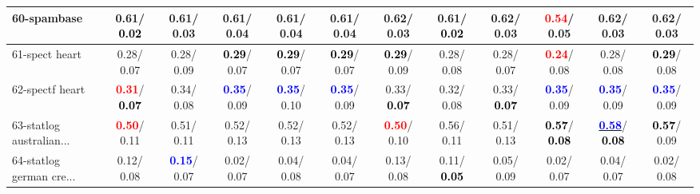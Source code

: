 \begin{table}[h]
\begin{center}
{\begin{tabular}{lc|c|c|c|c|c|c|c|c|c|c}
60-spambase &   0.61/\textcolor{black}{\textbf{  0.02}} &   0.61/  0.03 &   0.61/  0.04 &   0.61/  0.04 &   0.61/  0.04 &   0.62/  0.03 &   0.61/\textcolor{black}{\textbf{  0.02}} &   0.62/  0.03 & \textcolor{red}{\textbf{  0.54}}/  0.05 &   0.62/  0.03 &   0.62/  0.03 \\ \hline
61-spect heart &   0.28/  0.07 &   0.28/  0.09 & \textcolor{black}{\textbf{  0.29}}/  0.07 & \textcolor{black}{\textbf{  0.29}}/  0.07 & \textcolor{black}{\textbf{  0.29}}/  0.07 & \textcolor{black}{\textbf{  0.29}}/  0.09 &   0.28/  0.08 &   0.28/  0.07 & \textcolor{red}{\textbf{  0.24}}/  0.08 &   0.28/  0.08 & \textcolor{black}{\textbf{  0.29}}/  0.08 \\
62-spectf heart & \textcolor{red}{\textbf{  0.31}}/\textcolor{black}{\textbf{  0.07}} &   0.34/  0.08 & \textcolor{blue}{\textbf{  0.35}}/  0.09 & \textcolor{blue}{\textbf{  0.35}}/  0.10 & \textcolor{blue}{\textbf{  0.35}}/  0.09 &   0.33/\textcolor{black}{\textbf{  0.07}} &   0.32/  0.08 &   0.33/\textcolor{black}{\textbf{  0.07}} & \textcolor{blue}{\textbf{  0.35}}/  0.09 & \textcolor{blue}{\textbf{  0.35}}/  0.09 & \textcolor{blue}{\textbf{  0.35}}/  0.09 \\
63-statlog australian... & \textcolor{red}{\textbf{  0.50}}/  0.11 &   0.51/  0.11 &   0.52/  0.13 &   0.52/  0.13 &   0.52/  0.13 & \textcolor{red}{\textbf{  0.50}}/  0.10 &   0.56/  0.11 &   0.51/  0.13 & \textcolor{black}{\textbf{  0.57}}/\textcolor{black}{\textbf{  0.08}} & \underline{\textcolor{blue}{\textbf{  0.58}}}/\textcolor{black}{\textbf{  0.08}} & \textcolor{black}{\textbf{  0.57}}/  0.09 \\
64-statlog german cre... &   0.12/  0.08 & \textcolor{blue}{\textbf{  0.15}}/  0.07 &   0.02/  0.07 &   0.04/  0.08 &   0.04/  0.07 &   0.13/  0.08 &   0.11/\textcolor{black}{\textbf{  0.05}} &   0.05/  0.09 &   0.02/  0.07 &   0.04/  0.07 &   0.02/  0.08 \\\end{tabular}}\label{stratsALCKappa1besta}
\end{center}
\end{table}
